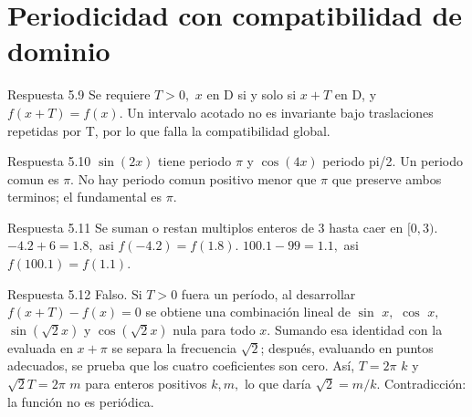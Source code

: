 \documentclass[10pt,a4paper,oneside,openany]{book}
\begin{document}
\section{Periodicidad con compatibilidad de dominio}
\begin{PSevenAnswerFixed}{Respuesta 5.9}
Se requiere \(T>0,\) \(x\) en D si y solo si \(x+T\) en D, y \(f(x+T)=f(x)\). Un intervalo acotado no es invariante bajo traslaciones repetidas por T, por lo que falla la compatibilidad global.
\end{PSevenAnswerFixed}
\begin{PSevenAnswerFixed}{Respuesta 5.10}
\(\sin(2x)\) tiene periodo \(\pi \) y \(\cos(4x)\) periodo pi/2. Un periodo comun es \(\pi \). No hay periodo comun positivo menor que \(\pi \) que preserve ambos terminos; el fundamental es \(\pi \).
\end{PSevenAnswerFixed}
\begin{PSevenAnswerFixed}{Respuesta 5.11}
Se suman o restan multiplos enteros de \(3\) hasta caer en \([0,3)\). \(-4.2+6=1.8,\) asi \(f(-4.2)=f(1.8)\). \(100.1-99=1.1,\) asi \(f(100.1)=f(1.1)\).
\end{PSevenAnswerFixed}
\begin{PSevenAnswerFixed}{Respuesta 5.12}
Falso. Si \(T>0\) fuera un período, al desarrollar \(f(x+T)-f(x)=0\) se obtiene una combinación lineal de \(\sin\) \(x,\) \(\cos\) \(x,\) \(\sin(\sqrt{2}x)\) y \(\cos(\sqrt{2}x)\) nula para todo \(x\). Sumando esa identidad con la evaluada en \(x+\pi \) se separa la frecuencia \(\sqrt{2}\); después, evaluando en puntos adecuados, se prueba que los cuatro coeficientes son cero. Así, \(T=2\pi \) \(k\) y \(\sqrt{2}T=2\pi \) \(m\) para enteros positivos \(k,m,\) lo que daría \(\sqrt{2}=m/k\). Contradicción: la función no es periódica.
\end{PSevenAnswerFixed}
\end{document}
